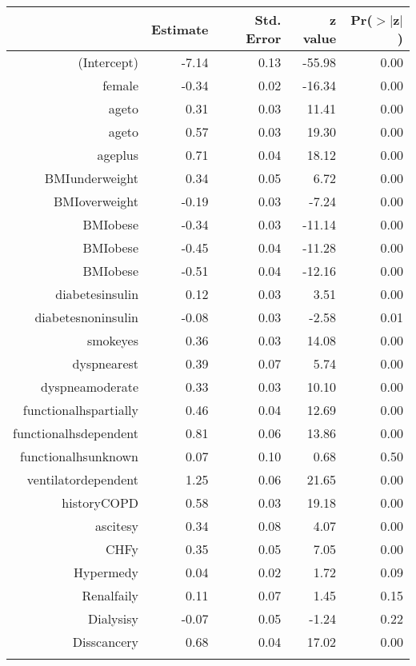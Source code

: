 \bigskip\bigskip
\centering
\begin{tabular}{rrrrr}
  \hline
 & Estimate & Std. Error & z value & Pr($>$$|$z$|$) \\ 
  \hline
(Intercept) & -7.14 & 0.13 & -55.98 & 0.00 \\ 
  female & -0.34 & 0.02 & -16.34 & 0.00 \\ 
  age\-65\-to\-74 & 0.31 & 0.03 & 11.41 & 0.00 \\ 
  age\-75\-to\-84 & 0.57 & 0.03 & 19.30 & 0.00 \\ 
  age\-85\-plus & 0.71 & 0.04 & 18.12 & 0.00 \\ 
  BMI\-underweight & 0.34 & 0.05 & 6.72 & 0.00 \\ 
  BMI\-overweight & -0.19 & 0.03 & -7.24 & 0.00 \\ 
  BMI\-obese\-1 & -0.34 & 0.03 & -11.14 & 0.00 \\ 
  BMI\-obese\-2 & -0.45 & 0.04 & -11.28 & 0.00 \\ 
  BMI\-obese\-3 & -0.51 & 0.04 & -12.16 & 0.00 \\ 
  diabetes\-insulin & 0.12 & 0.03 & 3.51 & 0.00 \\ 
  diabetes\-noninsulin & -0.08 & 0.03 & -2.58 & 0.01 \\ 
  smoke\-yes & 0.36 & 0.03 & 14.08 & 0.00 \\ 
  dyspnea\-rest & 0.39 & 0.07 & 5.74 & 0.00 \\ 
  dyspnea\-moderate & 0.33 & 0.03 & 10.10 & 0.00 \\ 
  functional\-hs\-partially & 0.46 & 0.04 & 12.69 & 0.00 \\ 
  functional\-hs\-dependent & 0.81 & 0.06 & 13.86 & 0.00 \\ 
  functional\-hs\-unknown & 0.07 & 0.10 & 0.68 & 0.50 \\ 
  ventilator\-dependent & 1.25 & 0.06 & 21.65 & 0.00 \\ 
  history\-COPD & 0.58 & 0.03 & 19.18 & 0.00 \\ 
  ascites\-y & 0.34 & 0.08 & 4.07 & 0.00 \\ 
  CHF\-y & 0.35 & 0.05 & 7.05 & 0.00 \\ 
  Hyper\-med\-y & 0.04 & 0.02 & 1.72 & 0.09 \\ 
  Renal\-fail\-y & 0.11 & 0.07 & 1.45 & 0.15 \\ 
  Dialysis\-y & -0.07 & 0.05 & -1.24 & 0.22 \\ 
  Diss\-cancer\-y & 0.68 & 0.04 & 17.02 & 0.00 \\ 
$$
\end{tabular}
